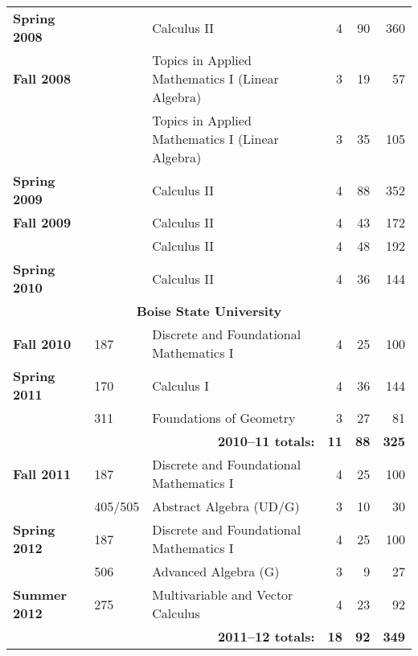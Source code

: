 \documentclass[12pt]{article}
\begin{document}
\begin{center}
\begin{longtable}{@{} l l l rrr @{}}
\textbf{Spring 2008} & & Calculus II & 4 & 90 & 360 \\
\addlinespace[0.1in]

\textbf{Fall 2008} & & Topics in Applied Mathematics I (Linear Algebra) & 3 & 19 & 57 \\
 & & Topics in Applied Mathematics I (Linear Algebra) & 3 & 35 & 105 \\
\addlinespace[0.1in]

\textbf{Spring 2009} & & Calculus II & 4 & 88 & 352 \\
\addlinespace[0.1in]

\textbf{Fall 2009} & & Calculus II & 4 & 43 & 172 \\
 & & Calculus II & 4 & 48 & 192 \\
\addlinespace[0.1in]

\textbf{Spring 2010} & & Calculus II & 4 & 36 & 144 \\

\midrule

\multicolumn{6}{c}{\textbf{Boise State University}} \\
\addlinespace[0.1in]

\textbf{Fall 2010} & 187 & Discrete and Foundational Mathematics I & 4 & 25 & 100 \\
\addlinespace[0.1in]

\textbf{Spring 2011} & 170 & Calculus I & 4 & 36 & 144 \\
 & 311 & Foundations of Geometry & 3 & 27 & 81 \\
 \cmidrule{3-6}
 & & \multicolumn{1}{r}{\textbf{2010--11 totals:}} & \textbf{11} & \textbf{88} & \textbf{325} \\
 \cmidrule{3-6}

\textbf{Fall 2011} & 187 & Discrete and Foundational Mathematics I & 4 & 25 & 100 \\
 & 405/505 & Abstract Algebra (UD/G) & 3 & 10 & 30 \\
\addlinespace[0.1in]

\textbf{Spring 2012} & 187 & Discrete and Foundational Mathematics I & 4 & 25 & 100 \\
 & 506 & Advanced Algebra (G) & 3 & 9 & 27 \\
\addlinespace[0.1in]

\textbf{Summer 2012} & 275 & Multivariable and Vector Calculus & 4 & 23 & 92 \\
 \cmidrule{3-6}
 & & \multicolumn{1}{r}{\textbf{2011--12 totals:}} & \textbf{18} & \textbf{92} & \textbf{349}\\
 \cmidrule{3-6}


\end{longtable}
\end{center}
\end{document}
